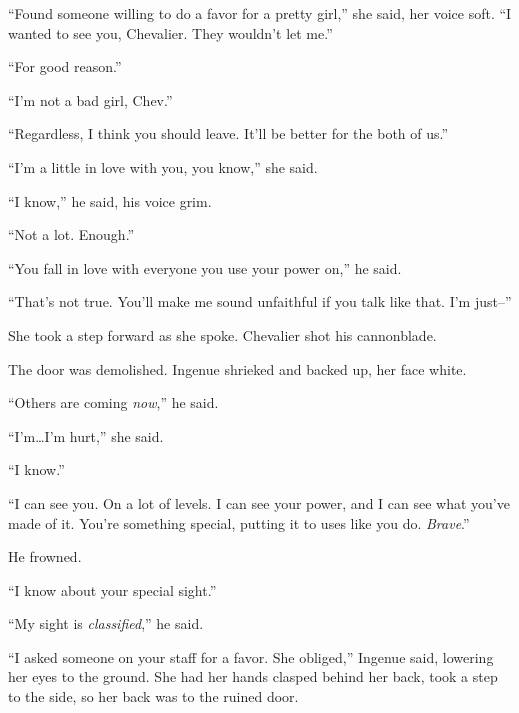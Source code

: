 ``Found someone willing to do a favor for a pretty girl,'' she said, her voice soft.  ``I wanted to see you, Chevalier.  They wouldn't let me.''



``For good reason.''



``I'm not a bad girl, Chev.''



``Regardless, I think you should leave.  It'll be better for the both of us.''



``I'm a little in love with you, you know,'' she said.



``I know,'' he said, his voice grim.



``Not a lot.  Enough.''



``You fall in love with everyone you use your power on,'' he said.



``That's not true.  You'll make me sound unfaithful if you talk like that.  I'm just--''



She took a step forward as she spoke.  Chevalier shot his cannonblade.



The door was demolished.  Ingenue shrieked and backed up, her face white.



``Others are coming \emph{now},'' he said.



``I'm\ldots I'm hurt,'' she said.



``I know.''



``I can see you.  On a lot of levels.  I can see your power, and I can see what you've made of it.  You're something special, putting it to uses like you do.  \emph{Brave}.''



He frowned.



``I know about your special sight.''



``My sight is \emph{classified},'' he said.



``I asked someone on your staff for a favor.  She obliged,'' Ingenue said, lowering her eyes to the ground.  She had her hands clasped behind her back, took a step to the side, so her back was to the ruined door.



